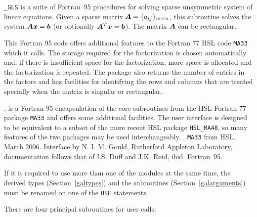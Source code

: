 \documentclass{galahad}
\newcommand{\packagename}{GLS}
\newcommand{\fullpackagename}{\libraryname\_\packagename}
\begin{document}
\galheader


\galsummary

{\tt \fullpackagename} is a suite of Fortran~95 procedures 
for solving sparse unsymmetric system of linear equations. Given
a sparse matrix ${\bm{A}} = \{a_{ij}\}_{m \times n}$, this
subroutine solves the system ${\bm{A}} {\bm{x}} = {\bm{b}}$ (or optionally
${\bm{A}}^T {\bm{x}} = {\bm{b}}$).
The matrix ${\bm{A}}$ can be rectangular. 

This Fortran 95 code offers additional features to the Fortran 77 HSL code 
{\tt MA33} which it calls. The storage required for the factorization is chosen
automatically and, if there is insufficient space for the factorization,
more space is allocated and the factorization is repeated.  The package
also returns the number of entries in the factors and has facilities
for identifying the rows and columns that are treated specially 
when the matrix is singular or rectangular.


\galattributes
\galversions{\tt  \fullpackagename\_single, \fullpackagename\_double}.
\galremark {\tt GALAHAD\_\packagename} is a Fortran 95 encapsulation of 
the core subroutines from the HSL Fortran 77 package {\tt MA33} and offers some 
additional facilities.  The user interface is designed to be
equivalent to a subset of the more recent HSL package {\tt HSL\_MA48}, 
so many features of the two packages may be used interchangeably.
, {\tt MA33} from HSL.
\galdate March 2006.
\galorigin Interface by N. I. M. Gould, Rutherford Appleton Laboratory,
documentation follows that of I.S. Duff and J.K. Reid, ibid.
\gallanguage Fortran~95. 


\galhowto



\noindent
If it is required to use more than one of the modules at the same time, 
the derived types
(Section~\ref{galtypes})
and the subroutines
(Section~\ref{galarguments})
must be renamed on one of the {\tt USE} statements.

There are four principal subroutines for user calls:
\end{document}
